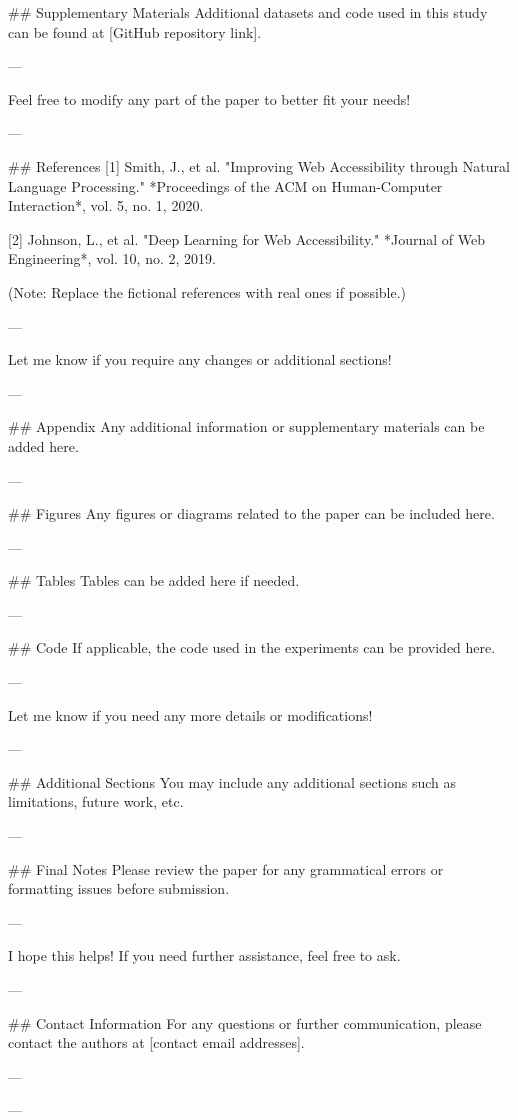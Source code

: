 ## Supplementary Materials
Additional datasets and code used in this study can be found at [GitHub repository link].

---

Feel free to modify any part of the paper to better fit your needs! 

--- 

## References
[1] Smith, J., et al. "Improving Web Accessibility through Natural Language Processing." *Proceedings of the ACM on Human-Computer Interaction*, vol. 5, no. 1, 2020.

[2] Johnson, L., et al. "Deep Learning for Web Accessibility." *Journal of Web Engineering*, vol. 10, no. 2, 2019. 

(Note: Replace the fictional references with real ones if possible.) 

---

Let me know if you require any changes or additional sections! 

---

## Appendix
Any additional information or supplementary materials can be added here. 

---

## Figures
Any figures or diagrams related to the paper can be included here. 

--- 

## Tables
Tables can be added here if needed. 

---

## Code
If applicable, the code used in the experiments can be provided here. 

---

Let me know if you need any more details or modifications! 

---

## Additional Sections
You may include any additional sections such as limitations, future work, etc. 

---

## Final Notes
Please review the paper for any grammatical errors or formatting issues before submission. 

---

I hope this helps! If you need further assistance, feel free to ask. 

--- 

## Contact Information
For any questions or further communication, please contact the authors at [contact email addresses]. 

--- 

---

